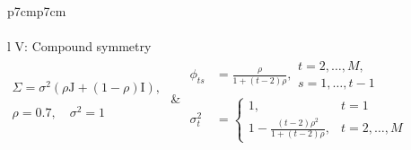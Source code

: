 \begin{table}[H]
\begin{tabular}{p{7cm}p{7cm}}
 \\
\hline
\\
 {l} {V: Compound symmetry} \\[0.3cm]
 $\begin{array}{l}\Sigma = \sigma^2\left(\rho \mathrm{J} + \left(1-\rho\right)\mathrm{I}\right),  \\
 \\
  \rho=0.7, \quad \sigma^2=1 \end{array}$  &  $\begin{aligned}
\phi_{ts} &= \frac{\rho}{1 + \left(t-2\right)\rho}, \begin{array}{l} t = 2, \dots, M,\\ 
				 s = 1, \dots, t-1 \end{array}\\
\sigma_t^2 &= \left\{\begin{array}{ll} 1, & t = 1\\ 1 -\frac{\left(t-2\right)\rho^2}{1 + \left(t-2\right)\rho}, & t = 2, \dots, M \end{array}\right.
\end{aligned}$ \\
 \\
\hline
\end{tabular} \label{table:simulation-model-list}
\end{table}
 

